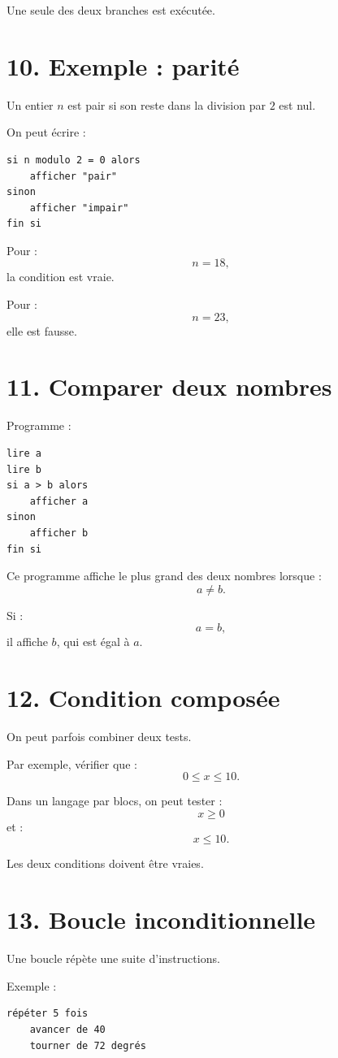 Une seule des deux branches est exécutée.

\section{10. Exemple : parité}

Un entier $n$ est pair si son reste dans la division par $2$ est nul.

On peut écrire :
\begin{verbatim}
si n modulo 2 = 0 alors
    afficher "pair"
sinon
    afficher "impair"
fin si
\end{verbatim}

Pour :
\[
n=18,
\]
la condition est vraie.

Pour :
\[
n=23,
\]
elle est fausse.

\section{11. Comparer deux nombres}

Programme :
\begin{verbatim}
lire a
lire b
si a > b alors
    afficher a
sinon
    afficher b
fin si
\end{verbatim}

Ce programme affiche le plus grand des deux nombres lorsque :
\[
a\neq b.
\]

Si :
\[
a=b,
\]
il affiche $b$, qui est égal à $a$.

\section{12. Condition composée}

On peut parfois combiner deux tests.

Par exemple, vérifier que :
\[
0\le x\le10.
\]

Dans un langage par blocs, on peut tester :
\[
x\ge0
\]
et :
\[
x\le10.
\]

Les deux conditions doivent être vraies.

\section{13. Boucle inconditionnelle}

Une boucle répète une suite d'instructions.

Exemple :
\begin{verbatim}
répéter 5 fois
    avancer de 40
    tourner de 72 degrés
\end{verbatim}

